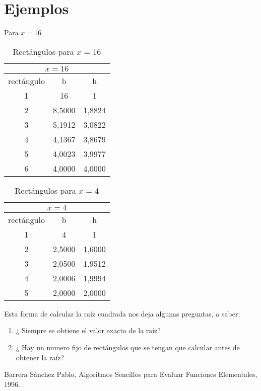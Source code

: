\documentclass[letter,12pt]{article}
\begin{document}
\section*{Ejemplos}
Para $x = 16$
\begin{table}[h!]
	\centering
	\begin{tabular}{ |c|c|c| } 
	  \multicolumn{3}{c}{$x = 16$}\\
	  \hline
	 	rectángulo & b & h \\
	  \hline
		1& 16	& 1\\
		2& 8,5000	& 1,8824\\
		3& 5,1912	& 3,0822\\
		4& 4,1367	& 3,8679\\
		5& 4,0023	& 3,9977\\
		6& 4,0000	& 4,0000\\
	 \hline
	\end{tabular}
\caption{Rectángulos para $x$ = 16 }
\label{table:1}
\end{table}

\begin{table}[h!]
	\centering
	\begin{tabular}{ |c|c|c| } 
	  \multicolumn{3}{c}{$x = 4$}\\
	  \hline
	 	rectángulo & b & h \\  
	  \hline
		  1& 4&	1\\ 
		  2& 2,5000&	1,6000\\
		  3& 2,0500&	1,9512\\
		  4& 2,0006&	1,9994\\
		  5& 2,0000&	2,0000\\
	 \hline
	\end{tabular}
	\caption{Rectángulos para $x$ = 4 }
	\label{table:2}
\end{table}
Esta forma de calcular la raíz cuadrada nos deja algunas preguntas, a saber:
\begin{enumerate}
\item ¿ Siempre se obtiene el valor exacto de la raíz?
\item ¿ Hay un numero fijo de rectángulos que se tengan que calcular antes de obtener la raíz?

\end{enumerate}


\begin{thebibliography}{0}
 Barrera Sánchez Pablo, Algoritmos Sencillos para Evaluar Funciones Elementales, 1996.
\end{thebibliography}
\end{document}
